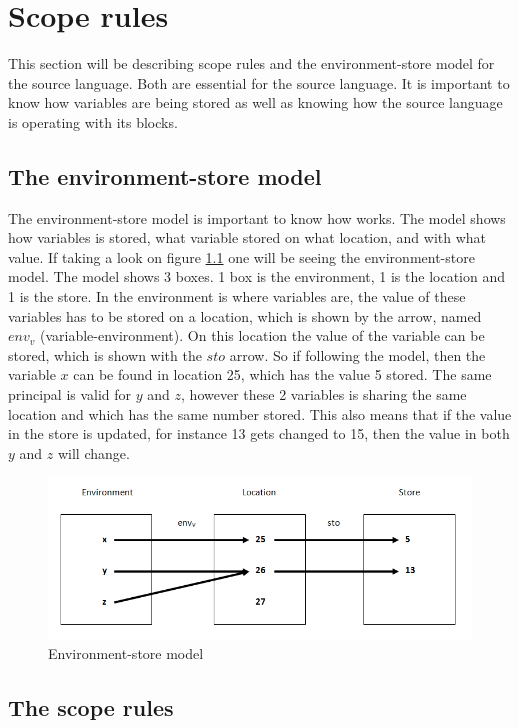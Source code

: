 \chapter{Scope rules}\label{chap:scope-rules}
This section will be describing scope rules and the environment-store model for the source language. Both are essential for the source language. It is important to know how variables are being stored as well as knowing how the source language is operating with its blocks. 

\section{The environment-store model}\label{sec:es-model}
The environment-store model is important to know how works. The model shows how variables is stored, what variable stored on what location, and with what value. If taking a look on figure \ref{fig:esmodel} one will be seeing the environment-store model. The model shows 3 boxes. 1 box is the environment, 1 is the location and 1 is the store. In the environment is where variables are, the value of these variables has to be stored on a location, which is shown by the arrow, named $env_v$ (variable-environment). On this location the value of the variable can be stored, which is shown with the $sto$ arrow. So if following the model, then the variable $x$ can be found in location 25, which has the value 5 stored. The same principal is valid for $y$ and $z$, however these 2 variables is sharing the same location and which has the same number stored. This also means that if the value in the store is updated, for instance 13 gets changed to 15, then the value in both $y$ and $z$ will change. 
\begin{figure}[H]
\includegraphics{billeder/environment_store_model.png}
\caption{Environment-store model}
\label{fig:esmodel}
\end{figure}


\section{The scope rules}\label{sec:scope-rules}




